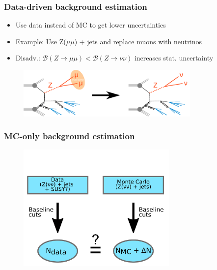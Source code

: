 


\begin{frame}
  \frametitle{Data-driven background estimation}
  \begin{itemize}
    \item Use data instead of MC to get lower uncertainties
    \item Example: Use Z($\mu \mu$) + jets and replace muons with neutrinos
    \item Disadv.: $\mathcal{B}(Z \rightarrow \mu \mu) < \mathcal{B}(Z \rightarrow \nu \nu)$ increases stat. uncertainty 
  \end{itemize}
  \begin{figure}[H]
    \centering
    \includegraphics[width=0.8\textwidth]{figures/zmumu}
  \end{figure}
\end{frame}

\begin{frame}
  \frametitle{MC-only background estimation}
  \begin{figure}[H]
    \centering
    \includegraphics[width=0.7\textwidth,height=0.7\textheight,keepaspectratio]{figures/mc_znunu}
  \end{figure}
\end{frame}

